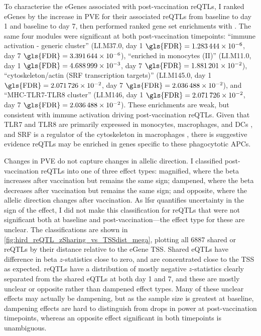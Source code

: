 To characterise the eGenes associated with post-vaccination \glspl{reQTL},
I ranked eGenes by the increase in \gls{PVE} for their associated \glspl{reQTL} from baseline to day 1 and baseline to day 7,
then performed ranked gene set enrichments with  \autocite{weiner3rd2016TmodPackageGeneral}.
%
%
The same four modules were significant at both post-vaccination timepoints:
\enquote{immune activation - generic cluster} (LI.M37.0, day 1 $\text{\gls{FDR}} = \num{1.283444e-06}$, day 7 $\text{\gls{FDR}} = \num{3.391644e-06}$),
\enquote{enriched in monocytes (II)} (LI.M11.0, day 1 $\text{\gls{FDR}} = \num{4.688999e-03}$, day 7 $\text{\gls{FDR}} = \num{1.881201e-02}$),
\enquote{cytoskeleton/actin (SRF transcription targets)} (LI.M145.0, day 1 $\text{\gls{FDR}} = \num{2.071726e-02}$, day 7 $\text{\gls{FDR}} = \num{2.036488e-02}$),
and \enquote{MHC-TLR7-TLR8 cluster} (LI.M146, day 1 $\text{\gls{FDR}} = \num{2.071726e-02}$, day 7 $\text{\gls{FDR}} = \num{2.036488e-02}$).
These enrichments are weak, but consistent with immune activation driving post-vaccination \glspl{reQTL}.
Given that TLR7 and TLR8 are primarily expressed in monocytes, macrophages, and \glspl{DC} \autocite{cervantes2012TLR8ForgottenRelative},
and SRF is a regulator of the cytoskeleton in macrophages \autocite{sullivan2011SerumResponseFactor}, 
there is suggestive evidence \glspl{reQTL} may be enriched in genes specific to these phagocytotic \glspl{APC}.

Changes in \gls{PVE} do not capture changes in allelic direction.
I classified post-vaccination \glspl{reQTL} into one of three effect types:
magnified, where the beta increases after vaccination but remains the same sign;
dampened, where the beta decreases after vaccination but remains the same sign;
and opposite, where the allelic direction changes after vaccination.
As \gls{lfsr} quantifies uncertainty in the sign of the effect, I did not make this classification for \glspl{reQTL} that were not significant both at baseline and post-vaccination---the effect type for these are unclear.
The classifications are shown in \cref{fig:hird_reQTL_zSharing_vs_TSSdist_mega}, plotting all \num{6887} shared or \glspl{reQTL} by their distance relative to the eGene \gls{TSS}.
Shared \glspl{eQTL} have difference in beta $z$-statistics close to zero, and are concentrated close to the \gls{TSS} as expected.
\glspl{reQTL} have a distribution of mostly negative $z$-statistics clearly separated from the shared \glspl{eQTL} at both day 1 and 7,
and these are mostly unclear or opposite rather than dampened effect types.
Many of these unclear effects may actually be dampening, 
but as the sample size is greatest at baseline, 
dampening effects are hard to distinguish from drops in power at post-vaccination timepoints, 
whereas an opposite effect significant in both timepoints is unambiguous.

